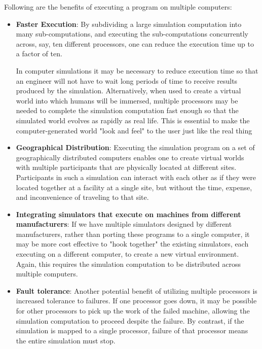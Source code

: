 \documentclass[12pt,a4paper]{article}
\begin{document}
	Following are the benefits of executing a program on multiple computers:
	\begin{itemize}
		\item \textbf{Faster Execution}: By subdividing a large simulation computation into many sub-computations, and executing the sub-computations concurrently across, say, ten different processors, one can reduce the execution time up to a factor of ten.
		
		In computer simulations it may be necessary to reduce execution time so that an engineer will not have to wait long periods of time to receive results produced by the simulation. Alternatively, when used to create a virtual world into which humans will be immersed, multiple processors may be needed to complete the simulation computation fast enough so that the simulated world evolves as rapidly as real life. This is essential to make the computer-generated world "look and feel" to the user just like the real thing
		
		\item \textbf{Geographical Distribution}: Executing the simulation program on a set of geographically distributed computers enables one to create virtual worlds with multiple participants that are physically located at different sites. Participants in such a simulation can interact with each other as if they were located together at a facility at a single site, but without the time, expense, and inconvenience of traveling to that site.
				
		\item \textbf{Integrating simulators that execute on machines from different manufacturers}: If we have multiple simulators designed by different manufacturers, rather than porting these programs to a single computer, it may be more cost effective to "hook together" the existing simulators, each executing on a different computer, to create a new virtual environment. Again, this requires the simulation computation to be distributed across multiple computers.
		
		\item \textbf{Fault tolerance}: Another potential benefit of utilizing multiple processors is increased tolerance to failures. If one processor goes down, it may be possible for other processors to pick up the work of the failed machine, allowing the simulation computation to proceed despite the failure. By contrast, if the simulation is mapped to a single processor, failure of that processor means the entire simulation must stop. 
	\end{itemize}
	
\end{document}
